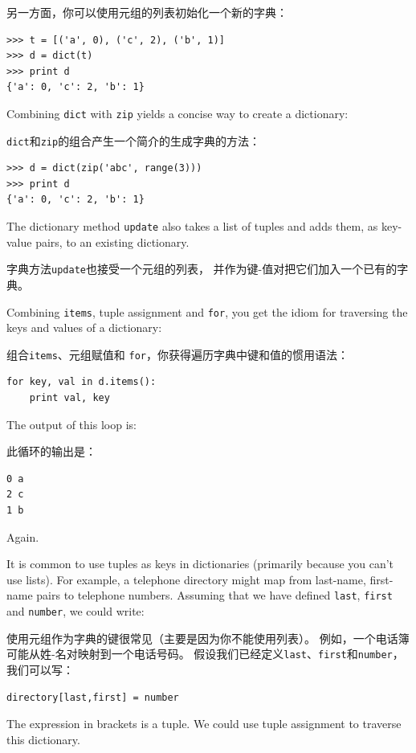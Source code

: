 \documentclass[10pt]{book}
\begin{document}
\begin{CJK}{UTF8}{gbsn}
另一方面，你可以使用元组的列表初始化一个新的字典：

\begin{verbatim}
>>> t = [('a', 0), ('c', 2), ('b', 1)]
>>> d = dict(t)
>>> print d
{'a': 0, 'c': 2, 'b': 1}
\end{verbatim}

Combining {\tt dict} with {\tt zip} yields a concise way
to create a dictionary:

{\tt dict}和{\tt zip}的组合产生一个简介的生成字典的方法：

\begin{verbatim}
>>> d = dict(zip('abc', range(3)))
>>> print d
{'a': 0, 'c': 2, 'b': 1}
\end{verbatim}
%
The dictionary method {\tt update} also takes a list of tuples
and adds them, as key-value pairs, to an existing dictionary.

字典方法{\tt update}也接受一个元组的列表，
并作为键-值对把它们加入一个已有的字典。

Combining {\tt items}, tuple assignment and {\tt for}, you
get the idiom for traversing the keys and values of a dictionary:

组合{\tt items}、元组赋值和 {\tt for}，你获得遍历字典中键和值的惯用语法：

\begin{verbatim}
for key, val in d.items():
    print val, key
\end{verbatim}
%
The output of this loop is:

此循环的输出是：

\begin{verbatim}
0 a
2 c
1 b
\end{verbatim}
%
Again.

It is common to use tuples as keys in dictionaries (primarily because
you can't use lists).  For example, a telephone directory might map
from last-name, first-name pairs to telephone numbers.  Assuming
that we have defined {\tt last}, {\tt first} and {\tt number}, we
could write:

使用元组作为字典的键很常见（主要是因为你不能使用列表）。
例如，一个电话簿可能从姓-名对映射到一个电话号码。
假设我们已经定义{\tt last}、{\tt first}和{\tt number}，
我们可以写：

\begin{verbatim}
directory[last,first] = number
\end{verbatim}
%
The expression in brackets is a tuple.  We could use tuple
assignment to traverse this dictionary.


\end{CJK}
\end{document}
